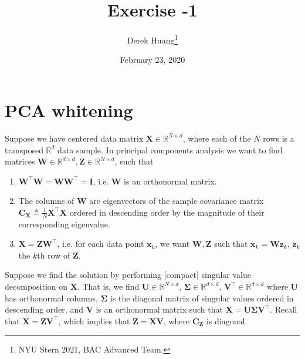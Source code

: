 \documentclass{article}
\title{Exercise -1}
\author{Derek Huang\thanks{NYU Stern 2021, BAC Advanced Team.}}
\date{February 23, 2020}
\numberwithin{equation}{section}
\begin{document}
\maketitle
\thispagestyle{fancy}

\section{PCA whitening}

Suppose we have centered data matrix $ \mathbf{X} \in
\mathbb{R}^{N \times d} $, where each of the $ N $ rows is a transposed
$ \mathbb{R}^d $ data sample. In principal components analysis we want to find
matrices $ \mathbf{W} \in \mathbb{R}^{d \times d},
\mathbf{Z} \in \mathbb{R}^{N \times d} $, such that
\begin{enumerate}
    \item
    $ \mathbf{W}^\top\mathbf{W} = \mathbf{WW}^\top = \mathbf{I} $, i.e.
    $ \mathbf{W} $ is an orthonormal matrix.

    \item
    The columns of $ \mathbf{W} $ are eigenvectors of the sample covariance
    matrix $ \mathbf{C}_\mathbf{X} \triangleq \frac{1}{N}\mathbf{X}^\top\mathbf{X} $
    ordered in descending order by the magnitude of their corresponding
    eigenvalue.

    \item
    $ \mathbf{X} = \mathbf{ZW}^\top $, i.e. for each data point
    $ \mathbf{x}_k $, we want $ \mathbf{W}, \mathbf{Z} $ such that
    $ \mathbf{x}_k = \mathbf{Wz}_k $, $ \mathbf{z}_k $ the $ k $th row of
    $ \mathbf{Z} $.
\end{enumerate}

Suppose we find the solution by performing [compact] singular value
decomposition on $ \mathbf{X} $. That is, we find $ \mathbf{U} \in
\mathbb{R}^{N \times d} $, $ \mathbf{\Sigma} \in \mathbb{R}^{d \times d} $,
$ \mathbf{V}^\top \in \mathbb{R}^{d \times d} $ where $ \mathbf{U} $ has
orthonormal columns, $ \mathbf{\Sigma} $ is the diagonal matrix of singular
values\footnotemark{} ordered in descending order, and $ \mathbf{V} $ is an orthonormal matrix
such that $ \mathbf{X} = \mathbf{U\Sigma V}^\top $. Recall that
$ \mathbf{X} = \mathbf{ZV}^\top $, which implies that
$ \mathbf{Z} = \mathbf{XV} $, where $ \mathbf{C}_\mathbf{Z} $ is diagonal.
\end{document}
